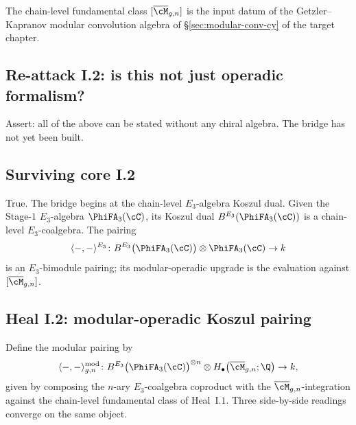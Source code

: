 The chain-level fundamental class $[\overline{\cM}_{g, n}]$ is the
input datum of the Getzler--Kapranov modular convolution algebra of
\S\ref{sec:modular-conv-cy} of the target chapter.

\subsection*{Re-attack I.2: is this not just operadic formalism?}

Assert: all of the above can be stated without any chiral algebra. The
bridge has not yet been built.

\subsection*{Surviving core I.2}

True. The bridge begins at the chain-level $E_3$-algebra Koszul dual.
Given the Stage-$1$ $E_3$-algebra $\PhiFA_3(\cC)$, its Koszul dual
$B^{E_3}(\PhiFA_3(\cC))$ is a chain-level $E_3$-coalgebra. The pairing
\[
 \langle -, - \rangle^{E_3} \colon B^{E_3}\bigl(\PhiFA_3(\cC)\bigr)
 \otimes \PhiFA_3(\cC) \to k
\]
is an $E_3$-bimodule pairing; its modular-operadic upgrade is the
evaluation against $[\overline{\cM}_{g, n}]$.

\subsection*{Heal I.2: modular-operadic Koszul pairing}

Define the modular pairing by
\begin{equation}
\label{eq:modular-koszul-pairing}
 \langle -, - \rangle^{\mathrm{mod}}_{g, n} \colon
 B^{E_3}\bigl(\PhiFA_3(\cC)\bigr)^{\otimes n} \otimes
 H_\bullet\bigl(\overline{\cM}_{g, n}; \Q\bigr) \to k,
\end{equation}
given by composing the $n$-ary $E_3$-coalgebra coproduct with the
$\overline{\cM}_{g, n}$-integration against the chain-level fundamental
class of Heal~I.$1$. Three side-by-side readings converge on the same
object.

